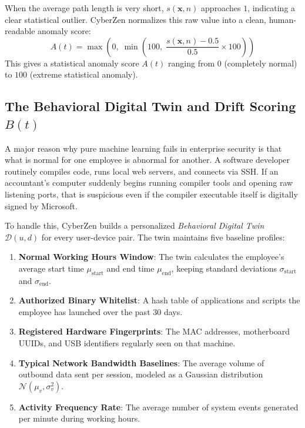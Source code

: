 \documentclass[conference]{IEEEtran}
\begin{document}
When the average path length is very short, $s(\mathbf{x}, n)$ approaches $1$, indicating a clear statistical outlier. CyberZen normalizes this raw value into a clean, human-readable anomaly score:
\begin{equation}
A(t) = \max\left(0, \; \min\left(100, \; \frac{s(\mathbf{x}, n) - 0.5}{0.5} \times 100\right)\right)
\end{equation}
This gives a statistical anomaly score $A(t)$ ranging from $0$ (completely normal) to $100$ (extreme statistical anomaly).

\subsection{The Behavioral Digital Twin and Drift Scoring $B(t)$}
A major reason why pure machine learning fails in enterprise security is that what is normal for one employee is abnormal for another. A software developer routinely compiles code, runs local web servers, and connects via SSH. If an accountant's computer suddenly begins running compiler tools and opening raw listening ports, that is suspicious even if the compiler executable itself is digitally signed by Microsoft.

To handle this, CyberZen builds a personalized \textit{Behavioral Digital Twin} $\mathcal{D}(u, d)$ for every user-device pair. The twin maintains five baseline profiles:
\begin{enumerate}
    \item \textbf{Normal Working Hours Window}: The twin calculates the employee's average start time $\mu_{\text{start}}$ and end time $\mu_{\text{end}}$, keeping standard deviations $\sigma_{\text{start}}$ and $\sigma_{\text{end}}$.
    \item \textbf{Authorized Binary Whitelist}: A hash table of applications and scripts the employee has launched over the past 30 days.
    \item \textbf{Registered Hardware Fingerprints}: The MAC addresses, motherboard UUIDs, and USB identifiers regularly seen on that machine.
    \item \textbf{Typical Network Bandwidth Baselines}: The average volume of outbound data sent per session, modeled as a Gaussian distribution $\mathcal{N}(\mu_v, \sigma_v^2)$.
    \item \textbf{Activity Frequency Rate}: The average number of system events generated per minute during working hours.
\end{enumerate}
\end{document}
